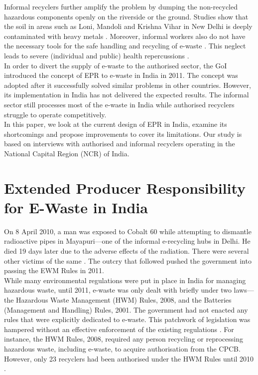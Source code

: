 \documentclass[a4paper, 12pt]{article}
\begin{document}
                    Informal recyclers further amplify the problem by dumping the non-recycled hazardous components openly on the riverside or the ground. Studies show that the soil in areas such as Loni, Mandoli and Krishna Vihar in New Delhi is deeply contaminated with heavy metals \parencite{toxicsreport, sahanews}. Moreover, informal workers also do not have the necessary tools for the safe handling and recycling of e-waste \parencite{kumarnews}. This neglect leads to severe (individual and public) health repercussions \parencite{bhowmicknews}. \\
                    
                    In order to divert the supply of e-waste to the authorised sector, the GoI introduced the concept of EPR to e-waste in India in 2011. The concept was adopted after it successfully solved similar problems in other countries. However, its implementation in India has not delivered the expected results. The informal sector still processes most of the e-waste in India while authorised recyclers struggle to operate competitively. \\
                    
                    In this paper, we look at the current design of EPR in India, examine its shortcomings and propose improvements to cover its limitations. Our study is based on interviews with authorised and informal recyclers operating in the National Capital Region (NCR) of India. \\ 
                    
                    \section{Extended Producer Responsibility for E-Waste in India}\label{sec:1}
                    
                    On 8 April 2010, a man was exposed to Cobalt 60 while attempting to dismantle radioactive pipes in Mayapuri—one of the informal e-recycling hubs in Delhi. He died 19 days later due to the adverse effects of the radiation. There were several other victims of the same \parencite{bhadurinews}. The outcry that followed pushed the government into passing the EWM Rules in 2011. \\
                    
                    While many environmental regulations were put in place in India for managing hazardous waste, until 2011, e-waste was only dealt with briefly under two laws—the Hazardous Waste Management (HWM) Rules, 2008, and the Batteries (Management and Handling) Rules, 2001. The government had not enacted any rules that were explicitly dedicated to e-waste. This patchwork of legislation was hampered without an effective enforcement of the existing regulations \parencite{kumarsinghpaper}. For instance, the HWM Rules, 2008, required any person recycling or reprocessing hazardous waste, including e-waste, to acquire authorisation from the CPCB. However, only 23 recyclers had been authorised under the HWM Rules until 2010 \parencite{bhaskarturagapapera}. \\
                    
\end{document}

